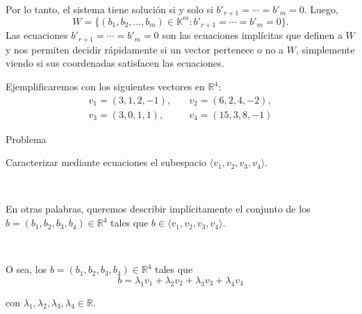 \documentclass[handout]{beamer} %
\newcommand{\R}{\mathbb R}
\newcommand{\K}{\mathbb K}
\begin{document}
\begin{frame}
    Por lo tanto, el sistema tiene solución si y solo si  $b'_{r+1} = \cdots = b'_m =0$. Luego, 
    \begin{equation*}
        W = \{(b_1,b_2, \ldots,b_m) \in \K^m: b'_{r+1} = \cdots = b'_m =0\}.
    \end{equation*}
    Las ecuaciones $ b'_{r+1} = \cdots = b'_m =0$ son las ecuaciones implícitas que definen a $W$ y nos permiten decidir rápidamente si un vector pertenece o no a $W$, simplemente viendo si sus coordenadas satisfacen las ecuaciones.

\end{frame}
    
    \begin{frame}
    Ejemplificaremos con los siguientes vectores en $\R^4$:
    \begin{align*}
    v_1=(3,1,2,-1),&\quad
    v_2=(6,2,4,-2),\\
    v_3=(3,0,1,1),&\quad
    v_4=(15,3,8,-1)
    \end{align*}
    \pause

    \begin{exampleblock}{Problema}\pause
    
    Caracterizar mediante ecuaciones el subespacio $\langle v_1, v_2, v_3, v_4\rangle$.
    
    \pause
    
    \
    
    En otras palabras, queremos describir implícitamente el conjunto de los $b=(b_1,b_2,b_3,b_4)
    \in\R^4$ tales que $b\in\langle v_1, v_2, v_3, v_4\rangle$.
    
    \

    \pause
    O sea, los $b=(b_1,b_2,b_3,b_4)
    \in\R^4$ tales que 
    \begin{equation*}
        b=\lambda_1v_1+\lambda_2v_2+\lambda_3v_3+\lambda_4v_4 \tag{*}
    \end{equation*}
    
    
    con $\lambda_1,\lambda_2,\lambda_3,\lambda_4\in\R$.
    \end{exampleblock}
    \end{frame}
    
\end{document}
